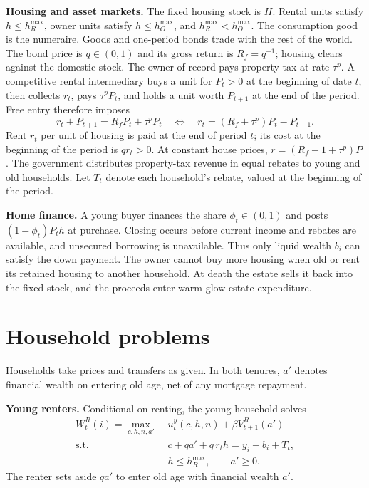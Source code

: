 \textbf{Housing and asset markets.}
The fixed housing stock is $\bar H$. Rental units satisfy
$h\leq h_R^{\max}$, owner units satisfy $h\leq h_O^{\max}$, and
$h_R^{\max}<h_O^{\max}$. The consumption good is the numeraire. Goods and one-period bonds trade
with the rest of the world. The bond price is $q\in(0,1)$ and its gross
return is $R_f=q^{-1}$; housing clears against the domestic stock. The owner
of record pays property tax at rate $\tau^p$. A competitive rental intermediary buys a unit for $P_t>0$ at the
beginning of date $t$, then collects $r_t$, pays $\tau^pP_t$, and holds a unit
worth $P_{t+1}$ at the end of the period. Free entry therefore imposes
\begin{equation}
 r_t+P_{t+1}=R_fP_t+\tau^pP_t
 \quad\Longleftrightarrow\quad
 r_t=(R_f+\tau^p)P_t-P_{t+1}.
 \label{eq:amend_usercost}
\end{equation}
Rent $r_t$ per unit of housing is paid at the end of period $t$; its cost
at the beginning of the period is $q r_t>0$. At constant house prices,
$r=(R_f-1+\tau^p)P$. The government distributes property-tax revenue
in equal rebates to young and old households. Let $T_t$ denote each
household's rebate, valued at the beginning of the period.

\textbf{Home finance.}
A young buyer finances the share $\phi_t\in(0,1)$ and posts
$(1-\phi_t)P_th$ at purchase. Closing occurs before current income and rebates
are available, and unsecured borrowing is unavailable. Thus only liquid
wealth $b_i$ can satisfy the down payment. The owner cannot buy more housing
when old or rent its retained housing to another household. At death the
estate sells it back into the fixed stock, and the proceeds enter warm-glow
estate expenditure.

\section{Household problems}

Households take prices and transfers as given. In both tenures, $a'$ denotes
financial wealth on entering old age, net of any mortgage repayment.

\textbf{Young renters.}
Conditional on renting, the young household solves
\begin{align}
 W_t^R(i)=\max_{c,h,n,a'}\;&u_t^y(c,h,n)+\beta V_{t+1}^R(a') \nonumber\\
 \text{s.t.}\quad&
 c+qa'+q\,r_th=y_i+b_i+T_t,\nonumber\\[-2pt]
 &h\leq h_R^{\max},\qquad a'\geq0.
 \label{eq:amend_young_renter}
\end{align}
The renter sets aside $qa'$ to enter old age with financial wealth $a'$.

